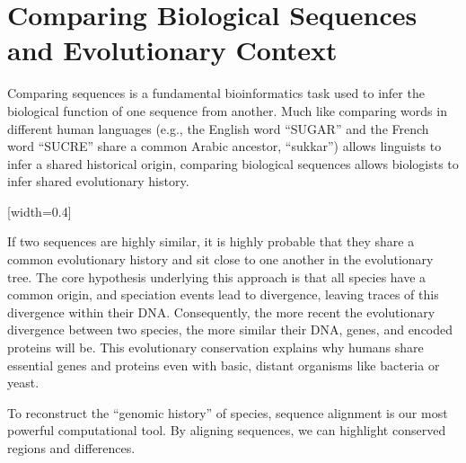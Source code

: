 
\section{Comparing Biological Sequences and Evolutionary Context}
Comparing sequences is a fundamental bioinformatics task used to infer the biological function of one sequence from another. Much like comparing words in different human languages (e.g., the English word ``SUGAR'' and the French word ``SUCRE'' share a common Arabic ancestor, ``sukkar'') allows linguists to infer a shared historical origin, comparing biological sequences allows biologists to infer shared evolutionary history.

[width=0.4\textwidth]

If two sequences are highly similar, it is highly probable that they share a common evolutionary history and sit close to one another in the evolutionary tree. The core hypothesis underlying this approach is that all species have a common origin, and speciation events lead to divergence, leaving traces of this divergence within their DNA. Consequently, the more recent the evolutionary divergence between two species, the more similar their DNA, genes, and encoded proteins will be. This evolutionary conservation explains why humans share essential genes and proteins even with basic, distant organisms like bacteria or yeast.


To reconstruct the ``genomic history'' of species, sequence alignment is our most powerful computational tool. By aligning sequences, we can highlight conserved regions and differences.

